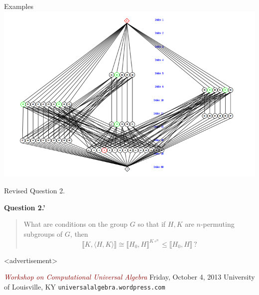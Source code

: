 \documentclass[xcolor=dvipsnames,9pt,hide notes,mathserif]{beamer}
\renewcommand{\alert}[1]{\textcolor{darkred}{\emph{#1}}}
\renewcommand{\leq}{\ensuremath{\leqslant}}
\newcommand{\circn}{\ensuremath{\circ^{n}}}
\newcommand{\lb}{\ensuremath{\llbracket}}
\newcommand{\rb}{\ensuremath{\rrbracket}}
\theoremstyle{definition}
\theoremstyle{remark}
\numberwithin{theorem}{section}
\numberwithin{claim}{section}
\numberwithin{equation}{section}
\numberwithin{conjecture}{section}
\newcommand{\<}{\ensuremath{\langle}}
\renewcommand{\>}{\ensuremath{\rangle}}
\begin{document}
\begin{frame}[fragile,label=A5]{Examples}
\includegraphics[width=\paperwidth]{inputs/A5}%
\end{frame}

\begin{frame}[label=answers]{Revised Question 2.}

{\bf Question 2.'} 
\begin{quote}
What are conditions on the group $G$ so that
\vskip3mm
if $H, K$ are $n$-permuting subgroups of $G$, then
\[
\lb K, \<H,K\>\rb \cong \lb H_0, H\rb^{ K \circn} \leq \lb H_0, H\rb \, ?
\]
\end{quote}
\end{frame}

\begin{frame}[fragile,label=plug]{{\tiny  <advertisement> }}
  \begin{center}
\alert{Workshop on Computational Universal Algebra}
\vskip3mm
Friday, October 4, 2013
\vskip3mm
University of Louisville, KY
\vskip3mm
\large{{\tt universalalgebra.wordpress.com}}
  \end{center}
\end{frame}
\end{document}
